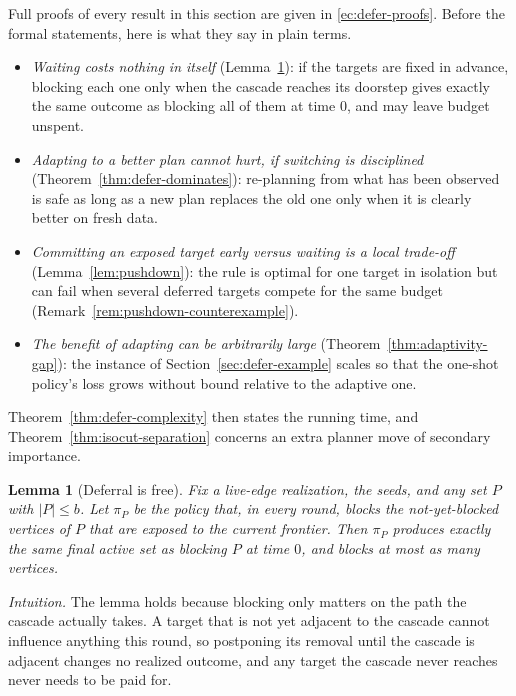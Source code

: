 \documentclass[preprint,11pt]{elsarticle}
\newtheorem{lemma}{Lemma}
\theoremstyle{definition}
\theoremstyle{remark}
\begin{document}
Full proofs of every result in this section are given in
\ref{ec:defer-proofs}. Before the formal statements, here
is what they say in plain terms.
\begin{itemize}
\item \emph{Waiting costs nothing in itself} (Lemma~\ref{lem:defer-free}):
  if the targets are fixed in advance, blocking each one only when the
  cascade reaches its doorstep gives exactly the same outcome as blocking
  all of them at time $0$, and may leave budget unspent.
\item \emph{Adapting to a better plan cannot hurt, if switching is
  disciplined} (Theorem~\ref{thm:defer-dominates}): re-planning from what
  has been observed is safe as long as a new plan replaces the old one only
  when it is clearly better on fresh data.
\item \emph{Committing an exposed target early versus waiting is a
  local trade-off} (Lemma~\ref{lem:pushdown}): the rule is optimal for one
  target in isolation but can fail when several deferred targets compete for
  the same budget (Remark~\ref{rem:pushdown-counterexample}).
\item \emph{The benefit of adapting can be arbitrarily large}
  (Theorem~\ref{thm:adaptivity-gap}): the instance of
  Section~\ref{sec:defer-example} scales so that the one-shot policy's
  loss grows without bound relative to the adaptive one.
\end{itemize}
Theorem~\ref{thm:defer-complexity} then states the running time, and
Theorem~\ref{thm:isocut-separation} concerns an extra planner move of
secondary importance.

\begin{lemma}[Deferral is free]\label{lem:defer-free}
Fix a live-edge realization, the seeds, and any set $P$ with $|P|\le b$. Let
$\pi_P$ be the policy that, in every round, blocks the not-yet-blocked
vertices of $P$ that are exposed to the current frontier. Then $\pi_P$
produces exactly the same final active set as blocking $P$ at time $0$, and
blocks at most as many vertices.
\end{lemma}

\emph{Intuition.} The lemma holds because blocking only matters on the
path the cascade actually takes. A target that is not yet adjacent to the
cascade cannot influence anything this round, so postponing its removal until
the cascade is adjacent changes no realized outcome, and any target the
cascade never reaches never needs to be paid for.
\end{document}
